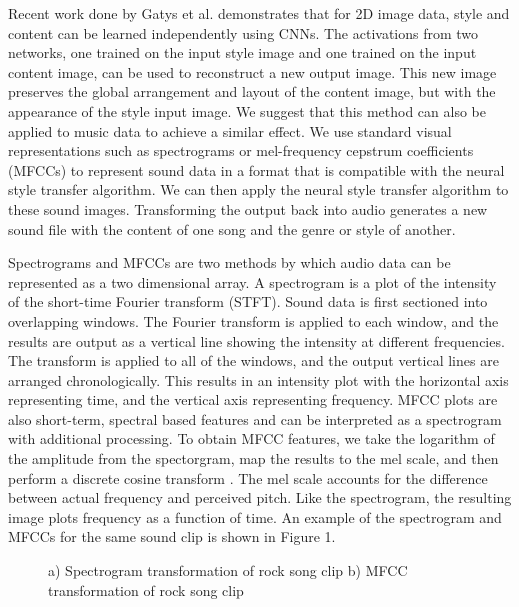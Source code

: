 \documentclass{article}
\begin{document}
Recent work done by Gatys et al. \citep{Gatys2015} demonstrates that for 2D image data, style and content can be learned independently using CNNs. The activations from two networks, one trained on the input style image and one trained on the input content image, can be used to reconstruct a new output image. This new image preserves the global arrangement and layout of the content image, but with the appearance of the style input image. We suggest that this method can also be applied to music data to achieve a similar effect. We use standard visual representations such as spectrograms or mel-frequency cepstrum coefficients (MFCCs) to represent sound data in a format that is compatible with the neural style transfer algorithm. We can then apply the neural style transfer algorithm to these sound images. Transforming the output back into audio generates a new sound file with the content of one song and the genre or style of another.

Spectrograms and MFCCs are two methods by which audio data can be represented as a two dimensional array. A spectrogram is a plot of the intensity of the short-time Fourier transform (STFT). Sound data is first sectioned into overlapping windows. The Fourier transform is applied to each window, and the results are output as a vertical line showing the intensity at different frequencies. The transform is applied to all of the windows, and the output vertical lines are arranged chronologically. This results in an intensity plot with the horizontal axis representing time, and the vertical axis representing frequency. MFCC plots are also short-term, spectral based features and can be interpreted as a spectrogram with additional processing. To obtain MFCC features, we take the logarithm of the amplitude from the spectorgram, map the results to the mel scale, and then perform a discrete cosine transform \citep{Logan2000}. The mel scale accounts for the difference between actual frequency and perceived pitch. Like the spectrogram, the resulting image plots frequency as a function of time. An example of the spectrogram and MFCCs for the same sound clip is shown in Figure 1.

\begin{figure}[h]
\begin{subfigure}{0.5\textwidth}
  \centering
  \fbox{\rule[-.5cm]{0cm}{4cm} \rule[-.5cm]{4cm}{0cm}}
  \caption{}
\end{subfigure}
 \begin{subfigure}{0.5\textwidth}
  \centering
  \fbox{\rule[-.5cm]{0cm}{4cm} \rule[-.5cm]{4cm}{0cm}}
  \caption{}
\end{subfigure}
\caption{a) Spectrogram transformation of rock song clip b) MFCC transformation of rock song clip}
\end{figure}
\end{document}
